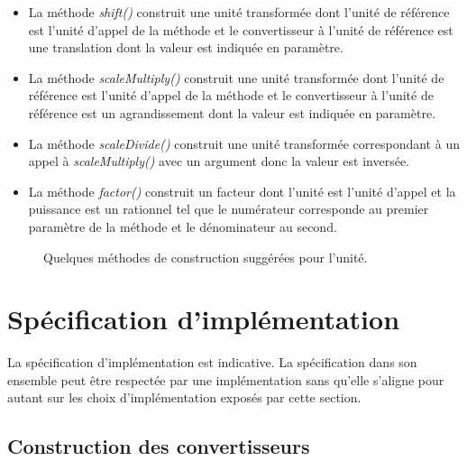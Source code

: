 \documentclass[a4paper,twoside,10pt]{article}
\begin{document}
\begin{itemize}
\item La méthode \emph{shift()} construit une unité transformée dont l'unité de référence est l'unité d'appel de la
méthode et le convertisseur à l'unité de référence est une translation dont la valeur est indiquée en paramètre.
\item La méthode \emph{scaleMultiply()} construit une unité transformée dont l'unité de référence est l'unité d'appel de
la méthode et le convertisseur à l'unité de référence est un agrandissement dont la valeur est indiquée en paramètre.
\item La méthode \emph{scaleDivide()} construit une unité transformée correspondant à un appel à \emph{scaleMultiply()}
avec un argument donc la valeur est inversée.
\item La méthode \emph{factor()} construit un facteur dont l'unité est l'unité d'appel et la puissance est un rationnel
tel que le numérateur corresponde au premier paramètre de la méthode et le dénominateur au second.
\end{itemize}


\begin{figure}[!h]
\caption{Quelques méthodes de construction suggérées pour l'unité.}
\end{figure}

\section{Spécification d'implémentation}

La spécification d'implémentation est indicative. La spécification dans son ensemble peut être respectée par une
implémentation sans qu'elle s'aligne pour autant sur les choix d'implémentation exposés par cette section.

\subsection{Construction des convertisseurs}
\end{document}
